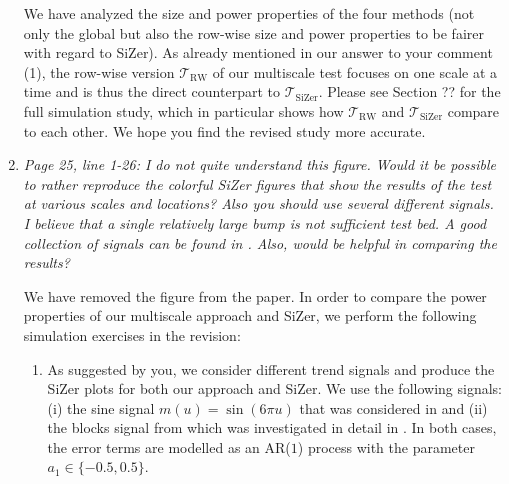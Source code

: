 \documentclass[a4paper,12pt]{article}
\begin{document}
\begin{enumerate}[label=(\arabic*),leftmargin=0.8cm]
\begin{itemize}[leftmargin=0.5cm,itemsep=0cm]
\end{itemize}
We have analyzed the size and power properties of the four methods (not only the global but also the row-wise size and power properties to be fairer with regard to SiZer). As already mentioned in our answer to your comment (1), the row-wise version $\mathcal{T}_{\text{RW}}$ of our multiscale test focuses on one scale at a time and is thus the direct counterpart to $\mathcal{T}_{\text{SiZer}}$. Please see Section ?? for the full simulation study, which in particular shows how $\mathcal{T}_{\text{RW}}$ and $\mathcal{T}_{\text{SiZer}}$ compare to each other. We hope you find the revised study more accurate.


\item \textit{Page 25, line 1-26: I do not quite understand this figure. Would it be possible to rather reproduce the colorful SiZer figures that show the results of the test at various scales and locations? Also you should use several different signals. I believe that a single relatively large bump is not sufficient test bed. A good collection of signals can be found in \cite{DonohoJohnstone1995}. Also, would \cite{HannigLeePark2013} be helpful in comparing the results?}

We have removed the figure from the paper. In order to compare the power properties of our multiscale approach and SiZer, we perform the following simulation exercises in the revision:
\begin{enumerate}[label=(\alph*), leftmargin=0.7cm]

\item As suggested by you, we consider different trend signals and produce the SiZer plots for both our approach and SiZer. We use the following signals: (i) the sine signal $m(u) = \sin(6\pi u)$ that was considered in \cite{ParkHannigKang2009} and (ii) the blocks signal from \cite{DonohoJohnstone1995} which was investigated in detail in \cite{HannigMarron2006}. In both cases, the error terms are modelled as an AR($1$) process with the parameter $a_1 \in\{-0.5,0.5\}$. 


\end{enumerate}
\end{enumerate}
\end{document}
